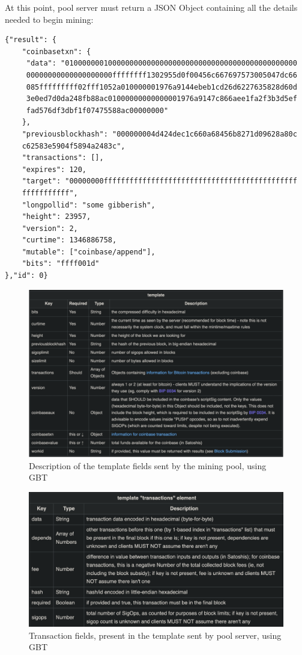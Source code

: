 \noindent At this point, pool server must return a JSON Object containing all the details needed to begin mining:
\begin{verbatim}
{"result": {
    "coinbasetxn": {
     "data": "010000000100000000000000000000000000000000000000000000
     00000000000000000000ffffffff1302955d0f00456c667697573005047dc66
     085fffffffff02fff1052a010000001976a9144ebeb1cd26d6227635828d60d
     3e0ed7d0da248fb88ac01000000000000001976a9147c866aee1fa2f3b3d5ef
     fad576df3dbf1f07475588ac00000000"
    },
    "previousblockhash": "000000004d424dec1c660a68456b8271d09628a80c
    c62583e5904f5894a2483c",
    "transactions": [],
    "expires": 120,
    "target": "00000000fffffffffffffffffffffffffffffffffffffffffffff
    fffffffffff",
    "longpollid": "some gibberish",
    "height": 23957,
    "version": 2,
    "curtime": 1346886758,
    "mutable": ["coinbase/append"],
    "bits": "ffff001d"
},"id": 0} 
\end{verbatim}

\begin{figure}[h!]
\centering
\includegraphics[width=15cm]{Figures/gbt/gbt4.png}
\caption{Description of the template fields sent by the mining pool, using GBT}
\label{fig:gbt4}
\end{figure}

\begin{figure}[h!]
\centering
\includegraphics[width=15cm]{Figures/gbt/gbt5.png}
\caption{Transaction fields, present in the template sent by pool server, using GBT}
\label{fig:gbt5}
\end{figure}

